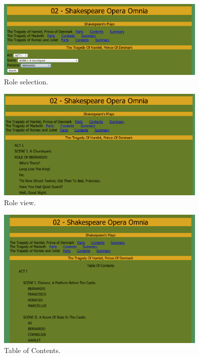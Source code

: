 \documentclass[a4paper, notitlepage]{article}
\begin{document}
\begin{figure}[ht]
\begin{center}
\includegraphics[width=0.9\textwidth]{02-2.png}
\caption{Role selection.}
\label{fig:01-3}
\end{center}
\end{figure}

\begin{figure}[ht]
\begin{center}
\includegraphics[width=0.9\textwidth]{02-3.png}
\caption{Role view.}
\label{fig:01-3}
\end{center}
\end{figure}

\begin{figure}[ht]
\begin{center}
\includegraphics[width=0.9\textwidth]{02-4.png}
\caption{Table of Contents.}
\label{fig:01-3}
\end{center}
\end{figure}
\end{document}
